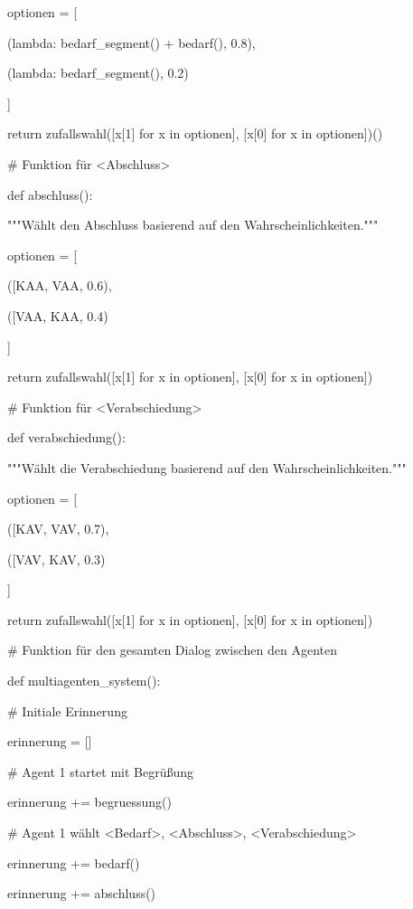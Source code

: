 \documentclass[
]{article}
\begin{document}
optionen = {[}

(lambda: bedarf\_segment() + bedarf(), 0.8),

(lambda: bedarf\_segment(), 0.2)

{]}

return zufallswahl({[}x{[}1{]} for x in optionen{]}, {[}x{[}0{]} for x
in optionen{]})()

\# Funktion für \textless Abschluss\textgreater{}

def abschluss():

"""Wählt den Abschluss basierend auf den Wahrscheinlichkeiten."""

optionen = {[}

({[}\textquotesingle KAA\textquotesingle,
\textquotesingle VAA\textquotesingle{]}, 0.6),

({[}\textquotesingle VAA\textquotesingle,
\textquotesingle KAA\textquotesingle{]}, 0.4)

{]}

return zufallswahl({[}x{[}1{]} for x in optionen{]}, {[}x{[}0{]} for x
in optionen{]})

\# Funktion für \textless Verabschiedung\textgreater{}

def verabschiedung():

"""Wählt die Verabschiedung basierend auf den Wahrscheinlichkeiten."""

optionen = {[}

({[}\textquotesingle KAV\textquotesingle,
\textquotesingle VAV\textquotesingle{]}, 0.7),

({[}\textquotesingle VAV\textquotesingle,
\textquotesingle KAV\textquotesingle{]}, 0.3)

{]}

return zufallswahl({[}x{[}1{]} for x in optionen{]}, {[}x{[}0{]} for x
in optionen{]})

\# Funktion für den gesamten Dialog zwischen den Agenten

def multiagenten\_system():

\# Initiale Erinnerung

erinnerung = {[}{]}

\# Agent 1 startet mit Begrüßung

erinnerung += begruessung()

\# Agent 1 wählt \textless Bedarf\textgreater,
\textless Abschluss\textgreater, \textless Verabschiedung\textgreater{}

erinnerung += bedarf()

erinnerung += abschluss()
\end{document}
